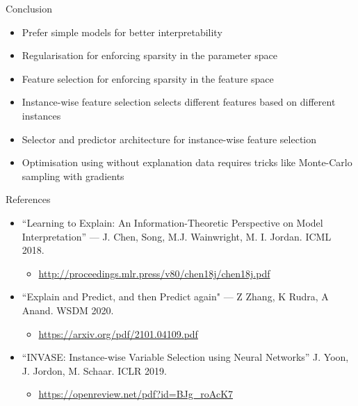 \documentclass[11pt,compress,t,notes=noshow, aspectratio=169, xcolor=table]{beamer}
\begin{document}
\begin{frame}[c]{Conclusion}
    \begin{itemize}
        \item Prefer simple models for better interpretability
        \item Regularisation for enforcing sparsity in the parameter space
        \item Feature selection for enforcing sparsity in the feature space
        \item Instance-wise feature selection selects different features based on different instances
        \item Selector and predictor architecture for instance-wise feature selection
        \item Optimisation using without explanation data requires tricks like Monte-Carlo sampling
with gradients
    \end{itemize}
\end{frame}

\begin{frame}[c]{References}
    \begin{itemize}
        \item “Learning to Explain: An Information-Theoretic Perspective on Model Interpretation” — J.
Chen, Song, M.J. Wainwright, M. I. Jordan. ICML 2018.
\begin{itemize}
    \item \url{http://proceedings.mlr.press/v80/chen18j/chen18j.pdf}
\end{itemize}
\bigskip
\item “Explain and Predict, and then Predict again" — Z Zhang, K Rudra, A Anand. WSDM 2020.
\begin{itemize}
    \item \url{https://arxiv.org/pdf/2101.04109.pdf}
\end{itemize}
\bigskip
\item “INVASE: Instance-wise Variable Selection using Neural Networks” J. Yoon, J. Jordon, M.
Schaar. ICLR 2019.
\begin{itemize}
    \item \url{https://openreview.net/pdf?id=BJg_roAcK7}
\end{itemize}
    \end{itemize}
\end{frame}
\endlecture
\end{document}
